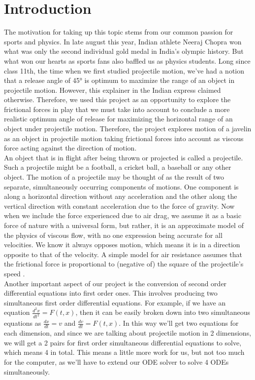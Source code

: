 \documentclass[12pt]{article}
\begin{document}
\section{Introduction}
\label{sec:intro}
The motivation for taking up this topic stems from our common passion for sports and physics. In late august this year, Indian athlete Neeraj Chopra won what was only the second individual gold medal in India’s olympic history. But what won our hearts as sports fans also baffled us as physics students. Long since class 11th, the time when we first studied projectile motion, we’ve had a notion that a release angle of 45° is optimum to maximize the range of an object in projectile motion. However, this explainer\cite{ref1} in the Indian express claimed otherwise. Therefore, we used this project as an opportunity to explore the frictional forces in play that we must take into account to conclude a more realistic optimum angle of release for maximizing the horizontal range of an object under projectile motion. Therefore, the project explores motion of a javelin as an object in projectile motion taking frictional forces into account as viscous force acting against the direction of motion. \\
An object that is in flight after being thrown or projected is called a projectile. Such a projectile might be a football, a cricket ball, a baseball or any other object. The motion of a projectile may be thought of as the result of two separate, simultaneously occurring components of motions. One component is along a horizontal direction without any acceleration and the other along the vertical direction with constant acceleration due to the force of gravity. Now when we include the force experienced due to air drag, we assume it as a basic force of nature with a universal form, but rather, it is an approximate model of the physics of viscous flow, with no one expression being accurate for all velocities. We know it always opposes motion, which means it is in a direction opposite to that of the velocity. A simple model for air resistance assumes that the frictional force is proportional to (negative of) the square of the projectile’s speed \cite{ref5}.  \\
Another important aspect of our project is the conversion of second order differential equations into first order ones. This involves producing two simultaneous first order differential equations. For example, if we have an equation $\frac{d^2x}{dt^2} = F(t,x)$, then it can be easily broken down into two simultaneous equations as $\frac{dx}{dt} = v$ and $\frac{dv}{dt} = F(t,x)$. In this way we'll get two equations for each dimension, and since we are talking about projectile motion in 2 dimensions, we will get a 2 pairs for first order simultaneous differential equations to solve, which means 4 in total. This means a little more work for us, but not too much for the computer, as we'll have to extend our ODE solver to solve 4 ODEs simultaneously.
\end{document}
